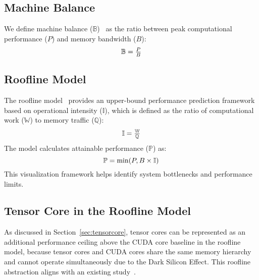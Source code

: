 
\subsection{Machine Balance} 

We define machine balance ($\mathbb{B}$)~\cite{mccalpin1995memory} as the ratio between peak computational performance ($P$) and memory bandwidth ($B$):
\begin{equation}\footnotesize
\mathbb{B}=\tfrac{P}{B}
\end{equation}
\subsection{Roofline Model}
The roofline model~\cite{williams2009roofline,ofenbeck2014applying} provides an upper-bound performance prediction framework based on operational intensity ($\mathbb{I}$), which is defined as the ratio of computational work ($\mathbb{W}$) to memory traffic ($\mathbb{Q}$):
\begin{equation}\footnotesize
\mathbb{I}=\tfrac{\mathbb{W}}{\mathbb{Q}}
\end{equation}
The model calculates attainable performance ($\mathbb{P}$) as:
\begin{equation}\footnotesize
\mathbb{P}=\min(P, B\times \mathbb{I})
\end{equation}
This visualization framework helps identify system bottlenecks and performance limits.
\subsection{Tensor Core in the Roofline Model}
As discussed in Section~\ref{sec:tensorcore}, tensor cores can be represented as an additional performance ceiling above the CUDA core baseline in the roofline model, because tensor cores and CUDA cores share the same memory hierarchy and cannot operate simultaneously due to the Dark Silicon Effect. This roofline abstraction aligns with an existing study~\cite{yang2020hierarchical}.



